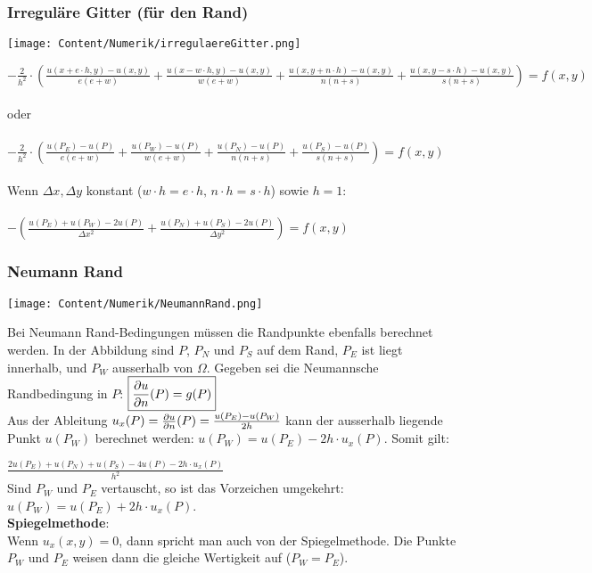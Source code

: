 \subsubsection{Irreguläre Gitter (für den Rand)}
\begin{minipage}{3cm}
  \texttt{[image: Content/Numerik/irregulaereGitter.png]}

\end{minipage}
\hfill
\begin{minipage}{14cm}

  $- \frac{2}{h^2} \cdot \left(\frac{u(x+e \cdot h,y)-u(x,y)}{e(e+w)} +\frac{u(x-w \cdot h,y)-u(x,y)}{w(e+w)}+\frac{u(x,y+n \cdot h)-u(x,y)}{n(n+s)} + \frac{u(x,y-s \cdot h)-u(x,y)}{s(n+s)}\right)=f(x,y)$\\
  \\
  oder\\
  \\
  $- \frac{2}{h^2} \cdot \left(\frac{u(P_E) - u(P)}{e(e+w)} + \frac{u(P_W) - u(P)}{w(e+w)} + \frac{u(P_N) - u(P)}{n(n+s)} + \frac{u(P_S) - u(P)}{s(n+s)}\right) = f(x,y)$\\
  \\
  Wenn $\Delta x, \Delta y$ konstant ($w \cdot h = e \cdot h,\, n \cdot h = s \cdot h$) sowie $h=1$:\\
  \\
  $-\left(\frac{u(P_E) + u(P_W) - 2 u(P)}{\Delta x^2} + \frac{u(P_N) + u(P_S) - 2 u(P)}{\Delta y^2}\right) = f(x,y)$\\

\end{minipage}
\subsubsection{Neumann Rand
}
\begin{minipage}{4cm}
  \texttt{[image: Content/Numerik/NeumannRand.png]}
\end{minipage}
\hfill
\begin{minipage}{14cm}
  Bei Neumann Rand-Bedingungen müssen die Randpunkte ebenfalls berechnet werden.
  In der Abbildung sind $P$, $P_N$ und $P_S$ auf dem Rand,
  $P_E$ ist liegt innerhalb, und $P_W$ ausserhalb von $\Omega$.
  Gegeben sei  die Neumannsche Randbedingung in $P$: $\boxed{\frac{\partial u}{\partial n}(P)=g(P)}$\\
  Aus der Ableitung $u_x(P) = \frac{\partial u}{\partial n}(P) = \frac{u(P_E)-u(P_W)}{2h}$
  kann der ausserhalb liegende Punkt $u(P_W)$ berechnet werden: $u(P_W)=u(P_E)-2h\cdot u_x(P)$.
  Somit gilt:

  $\boxed{\frac{2u(P_E) + u(P_N) +
        u(P_S)- 4 u(P) - 2h\cdot u_x(P)}{h^2}}$\\

  Sind $P_W$ und $P_E$ vertauscht, so ist das Vorzeichen umgekehrt:
  $u(P_W)=u(P_E)+2h\cdot u_x(P)$.\\

  \textbf{Spiegelmethode}:\\
  Wenn $u_x(x,y) = 0$, dann spricht man auch von der Spiegelmethode. Die Punkte $P_W$ und $P_E$ weisen dann die gleiche Wertigkeit auf ($P_W=P_E$).
\end{minipage}


